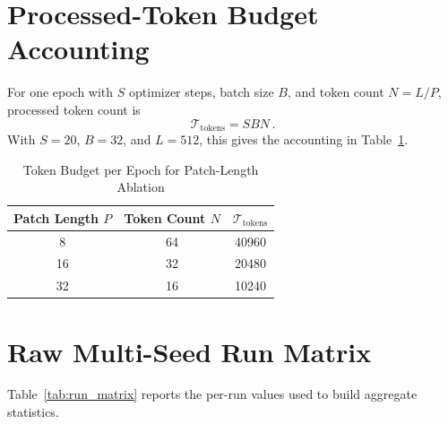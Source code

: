 \documentclass[journal]{IEEEtran}
\begin{document}
\section{Processed-Token Budget Accounting}
\label{app:token_budget}
For one epoch with $S$ optimizer steps, batch size $B$, and token count $N=L/P$, processed token count is
\begin{equation}
\mathcal{T}_{\text{tokens}} = S B N\,.
\end{equation}
With $S=20$, $B=32$, and $L=512$, this gives the accounting in Table~\ref{tab:token_budget}.

\begin{table}[t]
\caption{Token Budget per Epoch for Patch-Length Ablation}
\label{tab:token_budget}
\centering
\begin{tabular}{ccc}
\toprule
Patch Length $P$ & Token Count $N$ & $\mathcal{T}_{\text{tokens}}$ \\
\midrule
8  & 64 & 40960 \\
16 & 32 & 20480 \\
32 & 16 & 10240 \\
\bottomrule
\end{tabular}
\end{table}

\section{Raw Multi-Seed Run Matrix}
\label{app:run_matrix}
Table~\ref{tab:run_matrix} reports the per-run values used to build aggregate statistics.
\end{document}
